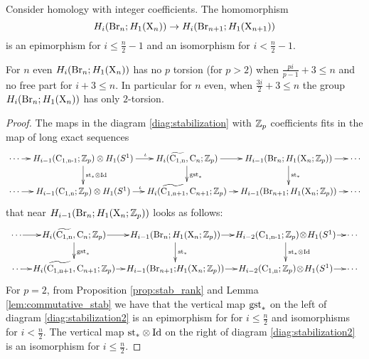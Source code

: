 \begin{thm}\label{thm:stabilization}
Consider homology with integer coefficients. The homomorphism 
$$
H_i(\operatorname{Br}_n; H_1(\mathrm{X}_n)) \to H_i(\operatorname{Br}_{n+1}; H_1(\mathrm{X}_{n+1}))
$$
is an epimorphism for $i \leq \frac{n}{2}-1 $
and an isomorphism for $i < \frac{n}{2}-1$.

For $n$ even $H_i(\operatorname{Br}_n; H_1(\mathrm{X}_n))$ has no $p$ torsion (for $p > 2$) when $\frac{pi}{p-1}+3 \leq n$ and no free part for $i+3 \leq n$. In particular for $n$ even,  when $\frac{3i}{2}+3 \leq n$ the group $H_i(\operatorname{Br}_n; H_1(\mathrm{X}_n))$ has only $2$-torsion.
\end{thm}
\begin{proof}
The maps in the diagram  \eqref{diag:stabilization} with $\mathbb{Z}_p$ coefficients fits in the map of long exact sequences
$$
\xymatrix @R=1.5pc @C=0.8pc {
\cdots \ar[r] &	H_{i-1}(\confm{n-1};\Z_p) \otimes H_1(S^1) \ar[d]^{\stab_* \otimes \Id} \ar[r]^(0.6){\iota}  &	H_i(\confmd{n}, \conf_n;\Z_p) \ar[d]^{\gstab_*} \ar[r] & H_{i-1} (\Br_n; H_1(\surf_n;\Z_p)) \ar[d]^{\stab_*} \ar[r] & \cdots\\
\cdots \ar[r] &	H_{i-1}(\confm{n};\Z_p) \otimes H_1(S^1) \ar[r]^(0.55){\iota}  & H_i(\confmd{n+1}, \conf_{n+1};\Z_p) \ar[r]  & H_{i-1} (\Br_{n+1}; H_1(\surf_n;\Z_p)) \ar[r] & \cdots
}
$$
that near $H_{i-1} (\operatorname{Br}_n; H_1(\mathrm{X}_n;\mathbb{Z}_p))$
looks as follows:
\begin{equation}\label{diag:stabilization2}
\begin{tabular}{l}
\xymatrix @R=1.5pc @C=0.8pc {
	\!\!\cdots\ar[r]\! &	\!H_i(\confmd{n}, \conf_n;\Z_p)\! \ar[d]^{\gstab_*} \ar[r] &\!H_{i-1} (\Br_n; H_1(\surf_n;\Z_p))\! \ar[d]^{\stab_*} \ar[r] &\!H_{i-2}(\confm{n-1};\Z_p)\! \otimes\!H_1(S^1)\! \ar[d]^{\stab_* \otimes \Id} \ar[r] &\!\cdots\!\!\\
	\!\!\cdots\!\ar[r]\!& \!H_i(\confmd{n+1}, \conf_{n+1};\Z_p)\! \ar[r]  & \!H_{i-1} (\Br_{n+1}; \!H_1(\surf_n;\Z_p))\!\ar[r] &	\!H_{i-2}(\confm{n};\Z_p) \! \otimes\!H_1(S^1)\!\ar[r]  & \!\cdots\!\!
}
\end{tabular}
\end{equation}
For $p=2$, from Proposition \ref{prop:stab_rank} and Lemma \ref{lem:commutative_stab} we have that the vertical map $\mathrm{gst}_*$ on the left of diagram \eqref{diag:stabilization2} is an epimorphism for for $i \leq \frac{n}{2}$ and isomorphisms for $i < \frac{n}{2}$. The vertical map $\mathrm{st}_* \otimes \mathrm{Id}$ on the right of diagram \eqref{diag:stabilization2} is an isomorphism for $i \leq \frac{n}{2}$.


\end{proof}
